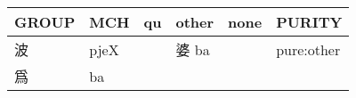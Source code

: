 \documentclass[14pt,a4paper]{scrartcl}
\begin{document}
\begin{longtable}[c]{@{}llllll@{}}
\toprule
\begin{minipage}[b]{0.14\columnwidth}\raggedright\strut
GROUP
\strut\end{minipage} &
\begin{minipage}[b]{0.14\columnwidth}\raggedright\strut
MCH
\strut\end{minipage} &
\begin{minipage}[b]{0.14\columnwidth}\raggedright\strut
qu
\strut\end{minipage} &
\begin{minipage}[b]{0.14\columnwidth}\raggedright\strut
other
\strut\end{minipage} &
\begin{minipage}[b]{0.14\columnwidth}\raggedright\strut
none
\strut\end{minipage} &
\begin{minipage}[b]{0.14\columnwidth}\raggedright\strut
PURITY
\strut\end{minipage}\tabularnewline
\midrule
\endhead
\begin{minipage}[t]{0.14\columnwidth}\raggedright\strut
波
\strut\end{minipage} &
\begin{minipage}[t]{0.14\columnwidth}\raggedright\strut
pjeX
\strut\end{minipage} &
\begin{minipage}[t]{0.14\columnwidth}\raggedright\strut
\strut\end{minipage} &
\begin{minipage}[t]{0.14\columnwidth}\raggedright\strut
婆 ba
\strut\end{minipage} &
\begin{minipage}[t]{0.14\columnwidth}\raggedright\strut
\strut\end{minipage} &
\begin{minipage}[t]{0.14\columnwidth}\raggedright\strut
pure:other
\strut\end{minipage}\tabularnewline
\begin{minipage}[t]{0.14\columnwidth}\raggedright\strut
爲
\strut\end{minipage} &
\begin{minipage}[t]{0.14\columnwidth}\raggedright\strut
ba
\strut\end{minipage} &
\begin{minipage}[t]{0.14\columnwidth}\raggedright\strut
\strut\end{minipage} &
\begin{minipage}[t]{0.14\columnwidth}\raggedright\strut

\end{minipage}
\end{longtable}
\end{document}
